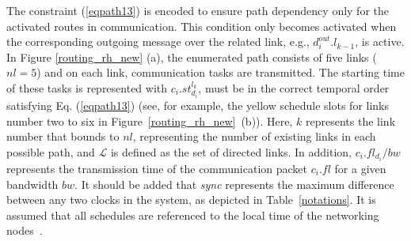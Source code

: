           The constraint (\ref{eqpath13}) is encoded to ensure path dependency only for the activated routes in communication. This condition only becomes activated when the corresponding outgoing message over the related link, e.g., $d^{out}_{i}.{l_{k-1}}$, is active. In Figure \ref{routing_rh_new} (a), the enumerated path consists of five links ($nl=5$) and on each link, communication tasks are transmitted. The starting time of these tasks is represented with $c_i.st_{d_i}^{l_{k}}$, must be in the correct temporal order satisfying Eq. (\ref{eqpath13}) (see, for example, the yellow schedule slots for links number two to six in Figure~\ref{routing_rh_new}~(b)). Here, $k$ represents the link number that bounds to $nl$, representing the number of existing links in each possible path, and $\mathcal{L}$ is defined as the set of directed links. In addition, $c_i.fl_{d_i}/bw$ represents the transmission time of the communication packet $c_i.fl$ for a given bandwidth $bw$. It should be added that \textit{sync} represents the maximum difference between any two clocks in the system, as depicted in Table~\ref{notations}.
          It is assumed that all schedules are referenced to the local time of the networking nodes~\cite{askaripoor2023designer}. 
          
          

    
  

